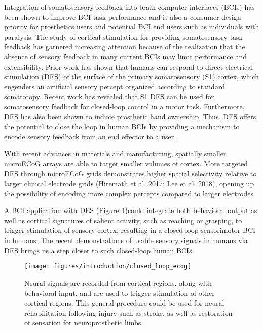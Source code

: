Integration of somatosensory feedback into brain-computer interfaces (BCIs) has been shown to improve BCI task performance \cite{Pistohl2015,Dadarlat2015,Klaes2014,Suminski2010,Schiefer2016a} and is also a consumer design priority for prosthetics users\cite{Biddiss2007a} and potential BCI end users such as individuals with paralysis\cite{Collinger2013,Anderson2004}. The study of cortical stimulation for providing somatosensory task feedback has garnered increasing attention because of the realization that the absence of sensory feedback in many current BCIs may limit performance and extensibility\cite{Bensmaia2014a}. Prior work has shown that humans can respond to direct electrical stimulation (DES) of the surface of the primary somatosensory (S1) cortex\cite{Johnson2013a,Hiremath2017,LIBET1964,Ray1999a}, which engenders an artificial sensory percept organized according to standard somatotopy. Recent work has revealed that S1 DES can be used for somatosensory feedback for closed-loop control in a motor task\cite{Cronin2016a}. Furthermore, DES has also been shown to induce prosthetic hand ownership\cite{Collins2016}. Thus, DES offers the potential to close the loop in human BCIs by providing a mechanism to encode sensory feedback from an end effector to a user.

With recent advances in materials and manufacturing, spatially smaller microECoG arrays are able to target smaller volumes of cortex. More targeted DES through microECoG grids demonstrates higher spatial selectivity relative to larger clinical electrode grids (Hiremath et al. 2017; Lee et al. 2018), opening up the possibility of encoding more complex percepts compared to larger electrodes.

A BCI application with DES (Figure \ref{fig:introClosedLoopS1})could integrate both behavioral output as well as cortical signatures of salient activity, such as reaching or grasping, to trigger stimulation of sensory cortex, resulting in a closed-loop sensorimotor BCI in humans. The recent demonstrations of usable sensory signals in humans via DES brings us a step closer to such closed-loop human BCIs.

\begin{figure}[ht]
	\centering
	\texttt{[image: figures/introduction/closed\_loop\_ecog]}
	\caption[Experimental protocol]{Neural signals are recorded from cortical regions, along with behavioral input, and are used to trigger stimulation of other cortical regions. This general procedure could be used for neural rehabilitation following injury such as stroke, as well as restoration of sensation for neuroprosthetic limbs.}
	\label{fig:introClosedLoopS1}
\end{figure}

